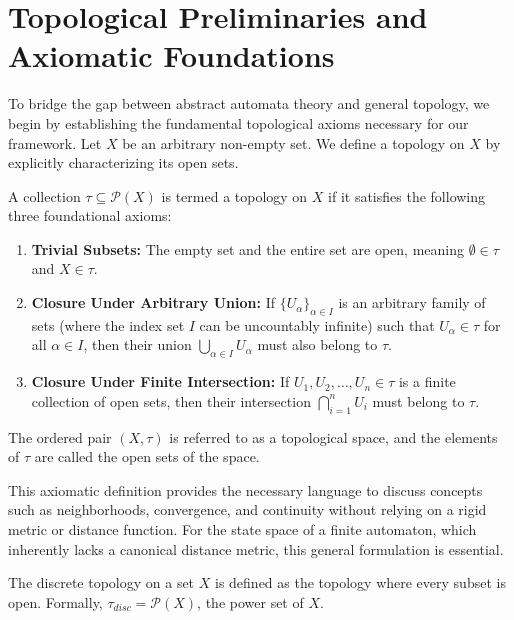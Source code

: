 \section{Topological Preliminaries and Axiomatic Foundations}

To bridge the gap between abstract automata theory and general topology, we begin by establishing the fundamental topological axioms necessary for our framework. Let $X$ be an arbitrary non-empty set. We define a topology on $X$ by explicitly characterizing its open sets.

\begin{definition}
\label{def:topological_space}
A collection $\tau \subseteq \mathcal{P}(X)$ is termed a topology on $X$ if it satisfies the following three foundational axioms:
\begin{enumerate}
    \item \textbf{Trivial Subsets:} The empty set and the entire set are open, meaning $\emptyset \in \tau$ and $X \in \tau$.
    \item \textbf{Closure Under Arbitrary Union:} If $\{U_\alpha\}_{\alpha \in I}$ is an arbitrary family of sets (where the index set $I$ can be uncountably infinite) such that $U_\alpha \in \tau$ for all $\alpha \in I$, then their union $\bigcup_{\alpha \in I} U_\alpha$ must also belong to $\tau$.
    \item \textbf{Closure Under Finite Intersection:} If $U_1, U_2, \ldots, U_n \in \tau$ is a finite collection of open sets, then their intersection $\bigcap_{i=1}^n U_i$ must belong to $\tau$.
\end{enumerate}
The ordered pair $(X, \tau)$ is referred to as a topological space, and the elements of $\tau$ are called the open sets of the space.
\end{definition}

This axiomatic definition provides the necessary language to discuss concepts such as neighborhoods, convergence, and continuity without relying on a rigid metric or distance function. For the state space of a finite automaton, which inherently lacks a canonical distance metric, this general formulation is essential.

\begin{definition}
\label{def:discrete_topology}
The discrete topology on a set $X$ is defined as the topology where every subset is open. Formally, $\tau_{disc} = \mathcal{P}(X)$, the power set of $X$. 
\end{definition}

